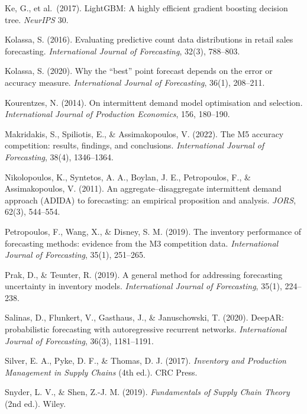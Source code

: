 \documentclass[11pt]{article}
\begin{document}
\begin{list}{}{%
  \setlength{\leftmargin}{1.5em}%
  \setlength{\itemindent}{-1.5em}%
  \setlength{\itemsep}{4pt}%
  \setlength{\parsep}{0pt}}
\item Ke, G., et al.\ (2017). LightGBM: A highly efficient gradient boosting
decision tree. \emph{NeurIPS} 30.

\item Kolassa, S. (2016). Evaluating predictive count data distributions in
retail sales forecasting. \emph{International Journal of Forecasting}, 32(3),
788--803.

\item Kolassa, S. (2020). Why the ``best'' point forecast depends on the
error or accuracy measure. \emph{International Journal of Forecasting}, 36(1),
208--211.

\item Kourentzes, N. (2014). On intermittent demand model optimisation and
selection. \emph{International Journal of Production Economics}, 156, 180--190.

\item Makridakis, S., Spiliotis, E., \& Assimakopoulos, V. (2022). The M5
accuracy competition: results, findings, and conclusions. \emph{International
Journal of Forecasting}, 38(4), 1346--1364.

\item Nikolopoulos, K., Syntetos, A. A., Boylan, J. E., Petropoulos, F., \&
Assimakopoulos, V. (2011). An aggregate--disaggregate intermittent demand
approach (ADIDA) to forecasting: an empirical proposition and analysis.
\emph{JORS}, 62(3), 544--554.

\item Petropoulos, F., Wang, X., \& Disney, S. M. (2019). The inventory
performance of forecasting methods: evidence from the M3 competition data.
\emph{International Journal of Forecasting}, 35(1), 251--265.

\item Prak, D., \& Teunter, R. (2019). A general method for addressing
forecasting uncertainty in inventory models. \emph{International Journal of
Forecasting}, 35(1), 224--238.

\item Salinas, D., Flunkert, V., Gasthaus, J., \& Januschowski, T. (2020).
DeepAR: probabilistic forecasting with autoregressive recurrent networks.
\emph{International Journal of Forecasting}, 36(3), 1181--1191.

\item Silver, E. A., Pyke, D. F., \& Thomas, D. J. (2017). \emph{Inventory and
Production Management in Supply Chains} (4th ed.). CRC Press.

\item Snyder, L. V., \& Shen, Z.-J. M. (2019). \emph{Fundamentals of Supply
Chain Theory} (2nd ed.). Wiley.


\end{list}
\end{document}
